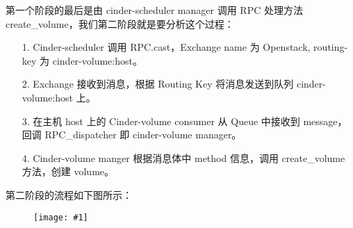 \documentclass[a4paper,left=1.5cm,right=1.5cm,11pt]{article}
\newcommand{\fic}[1]{\begin{figure}[H]
		\center
		\texttt{[image: \#1]}
	\end{figure}}
\begin{document}
	第一个阶段的最后是由 cinder-scheduler manager 调用 RPC 处理方法 create\_volume，我们第二阶段就是要分析这个过程：
	\begin{itemize}
		\item[1.] Cinder-scheduler 调用 RPC.cast，Exchange name 为 Openstack, routing-key 为 cinder-volume:host。
		\item[2.] Exchange 接收到消息，根据 Routing Key 将消息发送到队列 cinder-volume:host 上。
		\item[3.] 在主机 host 上的 Cinder-volume consumer 从 Queue 中接收到 message，回调 RPC\_dispatcher 即 cinder-volume manager。
		\item[4.] Cinder-volume manger 根据消息体中 method 信息，调用 create\_volume 方法，创建 volume。
	\end{itemize}

	第二阶段的流程如下图所示：
	\fic{6.jpg}
\end{document}
